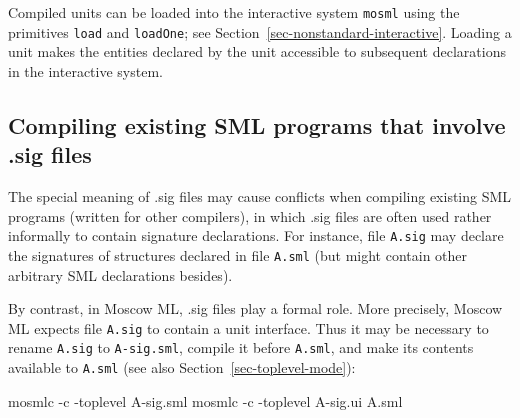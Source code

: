\documentclass[fleqn,a4paper]{article}
\begin{document}
Compiled units can be loaded into the interactive system {\tt mosml}
using the primitives {\tt load} and \texttt{loadOne}; see
Section~\ref{sec-nonstandard-interactive}.  Loading a unit makes the
entities declared by the unit accessible to subsequent declarations in
the interactive system.


\subsection{Compiling existing SML programs that involve .sig files}

The special meaning of .sig files may cause conflicts when compiling
existing SML programs (written for other compilers),
in which .sig files are often used rather
informally to contain signature declarations.  For instance, file
\texttt{A.sig} may declare the signatures of structures declared in
file \texttt{A.sml} (but might contain other arbitrary SML
declarations besides).

By contrast, in Moscow ML, .sig files play a formal role.  More
precisely, Moscow ML expects file \texttt{A.sig} to contain a unit
interface.  Thus it may be necessary to rename \texttt{A.sig} to
\texttt{A-sig.sml}, compile it before \texttt{A.sml}, and make its
contents available to \texttt{A.sml} (see also
Section~\ref{sec-toplevel-mode}):

\begin{program}
mosmlc -c -toplevel A-sig.sml
mosmlc -c -toplevel A-sig.ui A.sml
\end{program}





\end{document}

